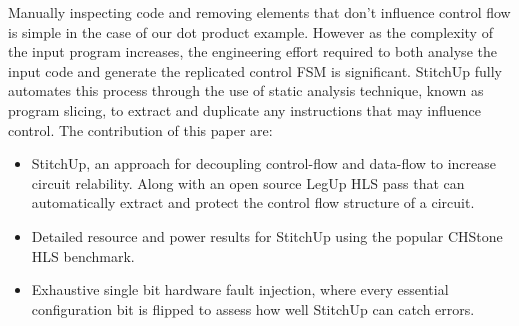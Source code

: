 Manually inspecting code and removing elements that don't influence control flow
is simple in the case of our dot product example.
However as the complexity of the input program increases,
the engineering effort required to both analyse the input code and generate
the replicated control FSM is significant.
StitchUp fully automates this process through the use of static analysis technique, known as program slicing, to extract
and duplicate any instructions that may influence control. The contribution of this paper are:

\vspace{-10pt}
\begin{itemize}
	\setlength{\itemsep}{1pt}
	\setlength{\parskip}{0pt}
	\setlength{\parsep}{0pt}
	\item StitchUp, an approach for decoupling control-flow and data-flow to increase circuit relability. Along with
          an open source LegUp HLS pass that can automatically extract and protect the control flow structure of a circuit.
	\item Detailed resource and power results for StitchUp using the popular CHStone HLS benchmark.
    \item Exhaustive single bit hardware fault injection, where every essential configuration bit is flipped to assess how well StitchUp can catch errors.
\end{itemize}
%
%
